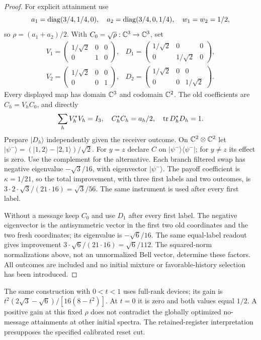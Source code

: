 \begin{proof}
For explicit attainment use
\[
 a_1=\operatorname{diag}(3/4,1/4,0),\quad
 a_2=\operatorname{diag}(3/4,0,1/4),\quad w_1=w_2=1/2,
\]
so $\rho=(a_1+a_2)/2$.  With $C_0=\sqrt\rho:\mathbb C^3\to\mathbb C^3$, set
\[
 \begin{array}{ll}
 V_1=\begin{pmatrix}1/\sqrt2&0&0\\0&1&0\end{pmatrix},&
 D_1=\begin{pmatrix}1/\sqrt2&0&0\\0&1/\sqrt2&0\end{pmatrix},\\[6pt]
 V_2=\begin{pmatrix}1/\sqrt2&0&0\\0&0&1\end{pmatrix},&
 D_2=\begin{pmatrix}1/\sqrt2&0&0\\0&0&1/\sqrt2\end{pmatrix}.
 \end{array}
\]
Every displayed map has domain $\mathbb C^3$ and codomain $\mathbb C^2$.
The old coefficients are $C_h=V_hC_0$, and directly
\[
 \sum_hV_h^*V_h=I_3,\quad C_h^*C_h=a_h/2,\quad
 \operatorname{tr} D_h^*D_h=1.
\]
Prepare $|D_h\rangle$ independently given the receiver outcome.
On $\mathbb C^2\otimes\mathbb C^2$ let
$|\psi^-\rangle=(|1,2\rangle-|2,1\rangle)/\sqrt2$.
For $y=z$ declare $C$ on
$|\psi^-\rangle\langle\psi^-|$; for $y\ne z$ its effect is zero.
Use the complement for the alternative.  Each branch filtered swap
has negative eigenvalue $-\sqrt3/16$, with eigenvector $|\psi^-\rangle$.
The payoff coefficient is $\kappa=1/21$, so the total improvement,
with three first labels and two outcomes, is
$3\cdot2\cdot\sqrt3/(21\cdot16)=\sqrt3/56$.
The same instrument is used after every first label.

Without a message keep $C_0$ and use $D_1$ after every first label.
The negative eigenvector is the antisymmetric vector in the first two
old coordinates and the two fresh coordinates; its eigenvalue is
$-\sqrt6/16$.  The same equal-label readout gives improvement
$3\cdot\sqrt6/(21\cdot16)=\sqrt6/112$.
The squared-norm normalizations above, not an unnormalized Bell
vector, determine these factors.  All outcomes are included and no
initial mixture or favorable-history selection has been introduced.
\end{proof}
The same construction with $0<t<1$ uses full-rank devices; its gain is
$t^2(2\sqrt3-\sqrt6)/[16(8-t^2)]$.  At $t=0$ it is zero and both
values equal $1/2$.  A positive gain at this fixed $\rho$ does not
contradict the globally optimized no-message attainments at other
initial spectra.  The retained-register interpretation presupposes
the specified calibrated reset cut.

